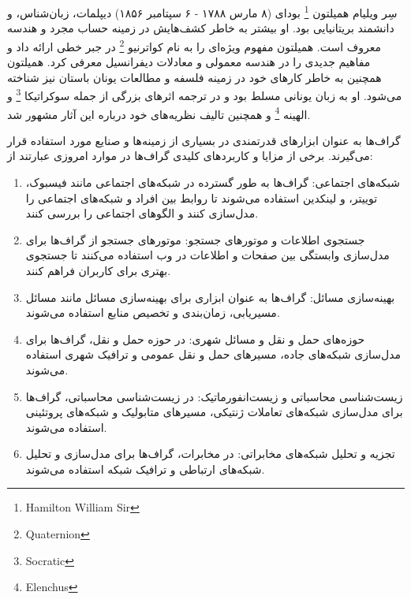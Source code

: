 \documentclass[a4paper,10pt]{book}
\begin{document}
        سِر ویلیام همیلتون
        \footnote{\hspace{2pt}Hamilton William Sir}
        بودای (۸ مارس ۱۷۸۸ - ۶ سپتامبر ۱۸۵۶) دیپلمات، زبان‌شناس، و دانشمند بریتانیایی بود. او بیشتر به خاطر کشف‌هایش در زمینه حساب مجرد و هندسه معروف است. همیلتون مفهوم ویژه‌ای را به نام کواترنیو
        \footnote{\hspace{2pt}Quaternion}
        در جبر خطی ارائه داد و مفاهیم جدیدی را در هندسه معمولی و معادلات دیفرانسیل معرفی کرد. همیلتون همچنین به خاطر کارهای خود در زمینه فلسفه و مطالعات یونان باستان نیز شناخته می‌شود. او به زبان یونانی مسلط بود و در ترجمه اثرهای بزرگی از جمله سوکراتیکا
        \footnote{\hspace{2pt}Socratic}
        و الهینه
        \footnote{\hspace{2pt}Elenchus}
        و همچنین تالیف نظریه‌های خود درباره این آثار مشهور شد.

        گراف‌ها به عنوان ابزارهای قدرتمندی در بسیاری از زمینه‌ها و صنایع مورد استفاده قرار می‌گیرند. برخی از مزایا و کاربردهای کلیدی گراف‌ها در موارد امروزی عبارتند از:

        \begin{enumerate}
            
            \item شبکه‌های اجتماعی: گراف‌ها به طور گسترده در شبکه‌های اجتماعی مانند فیسبوک، توییتر، و لینکدین استفاده می‌شوند تا روابط بین افراد و شبکه‌های اجتماعی را مدل‌سازی کنند و الگوهای اجتماعی را بررسی کنند.

            \item جستجوی اطلاعات و موتورهای جستجو: موتورهای جستجو از گراف‌ها برای مدل‌سازی وابستگی بین صفحات و اطلاعات در وب استفاده می‌کنند تا جستجوی بهتری برای کاربران فراهم کنند.

            \item بهینه‌سازی مسائل: گراف‌ها به عنوان ابزاری برای بهینه‌سازی مسائل مانند مسائل مسیریابی، زمان‌بندی و تخصیص منابع استفاده می‌شوند.

            \item حوزه‌های حمل و نقل و مسائل شهری: در حوزه حمل و نقل، گراف‌ها برای مدل‌سازی شبکه‌های جاده، مسیرهای حمل و نقل عمومی و ترافیک شهری استفاده می‌شوند.

            \item زیست‌شناسی محاسباتی و زیست‌انفورماتیک: در زیست‌شناسی محاسباتی، گراف‌ها برای مدل‌سازی شبکه‌های تعاملات ژنتیکی، مسیرهای متابولیک و شبکه‌های پروتئینی استفاده می‌شوند.

            \item تجزیه و تحلیل شبکه‌های مخابراتی: در مخابرات، گراف‌ها برای مدل‌سازی و تحلیل شبکه‌های ارتباطی و ترافیک شبکه استفاده می‌شوند.

        \end{enumerate}
\end{document}
